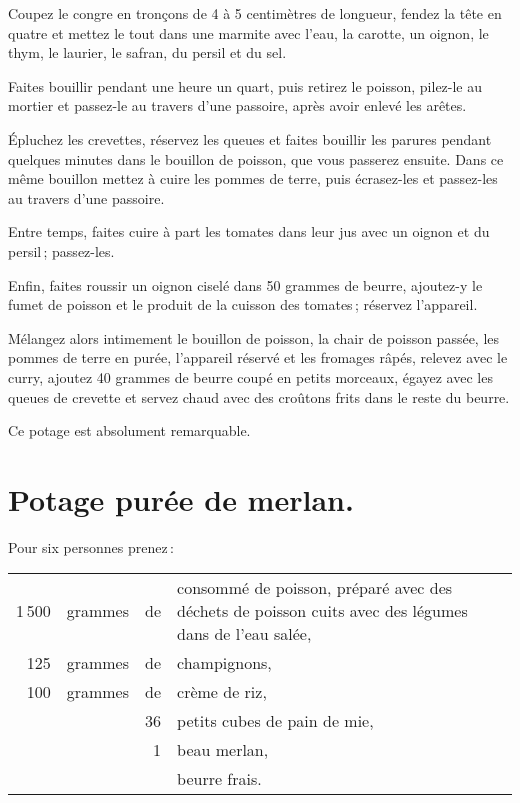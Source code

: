 Coupez le congre en tronçons de 4 à 5 centimètres de longueur, fendez la tête
en quatre et mettez le tout dans une marmite avec l'eau, la carotte, un oignon,
le thym, le laurier, le safran, du persil et du sel.

Faites bouillir pendant une heure un quart, puis retirez le poisson, pilez-le
au mortier et passez-le au travers d’une passoire, après avoir enlevé les
arêtes.

Épluchez les crevettes, réservez les queues et faites bouillir les parures
pendant quelques minutes dans le bouillon de poisson, que vous passerez
ensuite. Dans ce même bouillon mettez à cuire les pommes de terre, puis
écrasez-les et passez-les au travers d'une passoire.

Entre temps, faites cuire à part les tomates dans leur jus avec un oignon et du
persil ; passez-les.

Enfin, faites roussir un oignon ciselé dans 50 grammes de beurre, ajoutez-y le
fumet de poisson et le produit de la cuisson des tomates ; réservez l'appareil.

Mélangez alors intimement le bouillon de poisson, la chair de poisson passée,
les pommes de terre en purée, l'appareil réservé et les fromages râpés, relevez
avec le curry, ajoutez 40 grammes de beurre coupé en petits morceaux, égayez
avec les queues de crevette et servez chaud avec des croûtons frits dans le
reste du beurre.

Ce potage est absolument remarquable.

\section*{\centering Potage purée de merlan.}

Pour six personnes prenez :

\medskip

\footnotesize
\begin{longtable}{rrrp{16em}}                                                    
  1 500 & grammes & de  & consommé de poisson, préparé avec des déchets de poisson 
                          cuits avec des légumes dans de l'eau salée,                                     \\
    125 & grammes & de  & champignons,                                                                    \\
    100 & grammes & de  & crème de riz,                                                                   \\
        &         & 36  & petits cubes de pain de mie,                                                    \\
        &         & 1   & beau merlan,                                                                    \\
        &         &     & beurre frais.                                                                   \\
\end{longtable}
\normalsize

